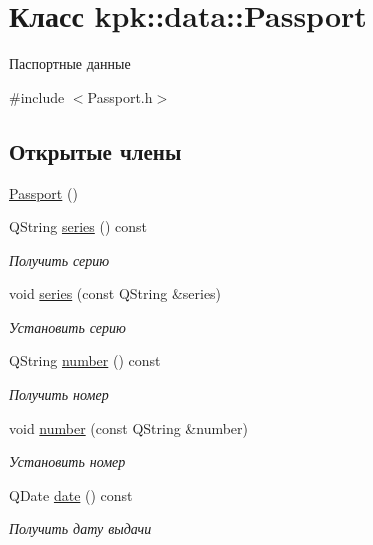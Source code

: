 \hypertarget{classkpk_1_1data_1_1_passport}{}\section{Класс kpk\+:\+:data\+:\+:Passport}
\label{classkpk_1_1data_1_1_passport}


Паспортные данные  




{\ttfamily \#include $<$Passport.\+h$>$}

\subsection*{Открытые члены}
\begin{DoxyCompactItemize}
\item 
\hyperlink{classkpk_1_1data_1_1_passport_accb776f86d1c4c8dded0604d4a671ee8}{Passport} ()
\item 
Q\+String \hyperlink{classkpk_1_1data_1_1_passport_aa39a5d6fe1bdd5f736b1fca37dda1850}{series} () const 
\begin{DoxyCompactList}\small\item\em Получить серию \end{DoxyCompactList}\item 
void \hyperlink{classkpk_1_1data_1_1_passport_aa535cb5a1d9c87fd5d6a0937df06280a}{series} (const Q\+String \&series)
\begin{DoxyCompactList}\small\item\em Установить серию \end{DoxyCompactList}\item 
Q\+String \hyperlink{classkpk_1_1data_1_1_passport_a2e2fa488ffaa7934db189d78c3a73319}{number} () const 
\begin{DoxyCompactList}\small\item\em Получить номер \end{DoxyCompactList}\item 
void \hyperlink{classkpk_1_1data_1_1_passport_a9f2ea239d9cfeaff6f986d6de87e4f16}{number} (const Q\+String \&number)
\begin{DoxyCompactList}\small\item\em Установить номер \end{DoxyCompactList}\item 
Q\+Date \hyperlink{classkpk_1_1data_1_1_passport_afe8d9f68888e8e820347d31f60485a24}{date} () const 
\begin{DoxyCompactList}\small\item\em Получить дату выдачи \end{DoxyCompactList}\item 

\end{DoxyCompactItemize}
